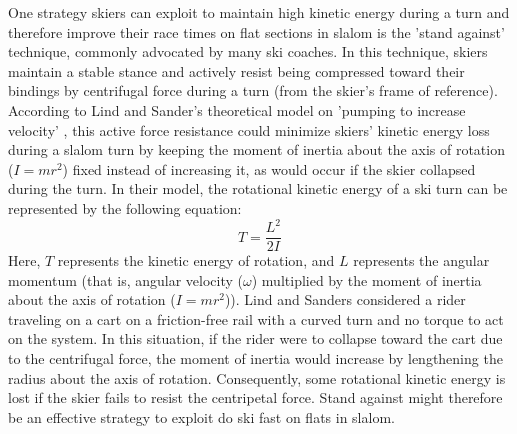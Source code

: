 \documentclass{report}
\begin{document}
One strategy skiers can exploit to maintain high kinetic energy during a turn and therefore improve their race times on flat sections in slalom is the 'stand against' technique, commonly advocated by many ski coaches. In this technique, skiers maintain a stable stance and actively resist being compressed toward their bindings by centrifugal force during a turn (from the skier's frame of reference). According to Lind and Sander's theoretical model on 'pumping to increase velocity' \cite{lind_physics_2013}, this active force resistance could minimize skiers' kinetic energy loss during a slalom turn by keeping the moment of inertia about the axis of rotation ($I = mr^2$) fixed instead of increasing it, as would occur if the skier collapsed during the turn. In their model, the rotational kinetic energy of a ski turn can be represented by the following equation: 
\[ T = \frac{L^2}{2I} \]
Here, $T$ represents the kinetic energy of rotation, and $L$ represents the angular momentum (that is, angular velocity ($\omega$) multiplied by the moment of inertia about the axis of rotation ($I = mr^2$)). Lind and Sanders considered a rider traveling on a cart on a friction-free rail with a curved turn and no torque to act on the system. In this situation, if the rider were to collapse toward the cart due to the centrifugal force, the moment of inertia would increase by lengthening the radius about the axis of rotation. Consequently, some rotational kinetic energy is lost if the skier fails to resist the centripetal force. Stand against might therefore be an effective strategy to exploit do ski fast on flats in slalom.  
\end{document}
